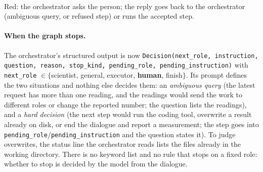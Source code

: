\documentclass[11pt,a4paper]{article}
\begin{document}
\begin{center}
\\[2pt]
{\small Red: the orchestrator asks the person; the reply goes back to the orchestrator (ambiguous query, or refused step) or runs the accepted step.}
\end{center}

\paragraph{When the graph stops.} The orchestrator's structured output is now
\texttt{Decision(next\_role, instruction, question, reason, stop\_kind, pending\_role, pending\_instruction)} with
\texttt{next\_role} $\in\{$scientist, general, executor, \textbf{human}, finish$\}$. Its prompt defines the two situations
and nothing else decides them: an \emph{ambiguous query} (the latest request has more than one reading, and the readings would
send the work to different roles or change the reported number; the question lists the readings), and a \emph{hard decision}
(the next step would run the coding tool, overwrite a result already on disk, or end the dialogue and report a measurement;
the step goes into \texttt{pending\_role}/\texttt{pending\_instruction} and the question states it). To judge overwrites, the
status line the orchestrator reads lists the files already in the working directory. There is no keyword list and no rule
that stops on a fixed role: whether to stop is decided by the model from the dialogue.
\end{document}
